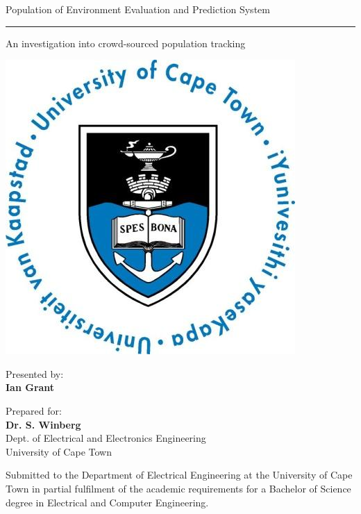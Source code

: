  



 
\thispagestyle{empty}
{\Huge \begin{center}

Population of Environment Evaluation and Prediction System
\hrule 
{\Large An investigation into crowd-sourced population tracking}
\end{center}}

\vskip 5mm
\begin{center}
\includegraphics[scale = 0.3]{uctLogo.png}
\end{center}

\vskip 10mm
\begin{center}
Presented by:\\
\textbf{\large Ian Grant}		
\end{center}

\vskip 10mm
\begin{center}
Prepared for:\\
\textbf{\large Dr. S. Winberg}\\ 		
Dept. of Electrical and Electronics Engineering\\University of Cape Town
\end{center}


\vskip 10mm
\begin{center}
Submitted to the Department of Electrical Engineering at the University of Cape Town in partial
fulfilment of the academic requirements for a Bachelor of Science degree in Electrical and Computer Engineering.

\end{center}


